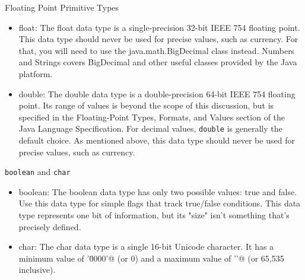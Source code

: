 \documentclass{beamer}
\begin{document}
\begin{frame}[fragile]{Floating Point Primitive Types}


\begin{itemize}
\item float: The float data type is a single-precision 32-bit IEEE 754 floating point. This data type should never be used for precise values, such as currency. For that, you will need to use the java.math.BigDecimal class instead. Numbers and Strings covers BigDecimal and other useful classes provided by the Java platform.

\item double: The double data type is a double-precision 64-bit IEEE 754 floating point. Its range of values is beyond the scope of this discussion, but is specified in the Floating-Point Types, Formats, and Values section of the Java Language Specification. For decimal values, {\tt double} is generally the default choice. As mentioned above, this data type should never be used for precise values, such as currency.
\end{itemize}

\end{frame}

\begin{frame}[fragile]{{\tt boolean} and {\tt char}}


\begin{itemize}
\item boolean: The boolean data type has only two possible values: true and false. Use this data type for simple flags that track true/false conditions. This data type represents one bit of information, but its "size" isn't something that's precisely defined.

\item char: The char data type is a single 16-bit Unicode character. It has a minimum value of \verb@'\u0000'@ (or 0) and a maximum value of \verb@'\uffff'@ (or 65,535 inclusive).
\end{itemize}


\end{frame}
\end{document}
